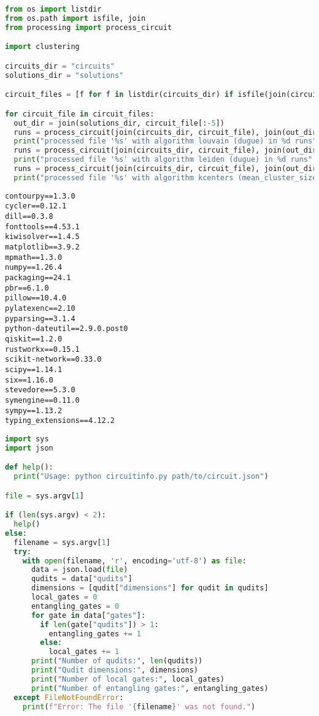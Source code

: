   \begin{lstlisting}[language=Python,caption=\texttt{main.py},label=lst:main.py]
from os import listdir
from os.path import isfile, join
from processing import process_circuit

import clustering

circuits_dir = "circuits"
solutions_dir = "solutions"

circuit_files = [f for f in listdir(circuits_dir) if isfile(join(circuits_dir, f))]

for circuit_file in circuit_files:
  out_dir = join(solutions_dir, circuit_file[:-5])
  runs = process_circuit(join(circuits_dir, circuit_file), join(out_dir, "louvain"), clustering.louvain(modularity="dugue"), max_runs=2)
  print("processed file '%s' with algorithm louvain (dugue) in %d runs" % (circuit_file, runs))
  runs = process_circuit(join(circuits_dir, circuit_file), join(out_dir, "leiden"), clustering.leiden(modularity="dugue"), max_runs=2)
  print("processed file '%s' with algorithm leiden (dugue) in %d runs" % (circuit_file, runs))
  runs = process_circuit(join(circuits_dir, circuit_file), join(out_dir, "kcenters"), clustering.kcenters(mean_cluster_size=4))
  print("processed file '%s' with algorithm kcenters (mean_cluster_size 4) in %d runs" % (circuit_file, runs))
  \end{lstlisting}
  \begin{lstlisting}[caption=\texttt{requirements.txt},label=lst:requirements.txt]
contourpy==1.3.0
cycler==0.12.1
dill==0.3.8
fonttools==4.53.1
kiwisolver==1.4.5
matplotlib==3.9.2
mpmath==1.3.0
numpy==1.26.4
packaging==24.1
pbr==6.1.0
pillow==10.4.0
pylatexenc==2.10
pyparsing==3.1.4
python-dateutil==2.9.0.post0
qiskit==1.2.0
rustworkx==0.15.1
scikit-network==0.33.0
scipy==1.14.1
six==1.16.0
stevedore==5.3.0
symengine==0.11.0
sympy==1.13.2
typing_extensions==4.12.2    
  \end{lstlisting}
  \begin{lstlisting}[language=Python,caption=\texttt{circuitinfo.py},label=lst:circuitinfo.py]
import sys
import json

def help():
  print("Usage: python circuitinfo.py path/to/circuit.json")

file = sys.argv[1]

if (len(sys.argv) < 2):
  help()
else:
  filename = sys.argv[1]
  try:
    with open(filename, 'r', encoding='utf-8') as file:
      data = json.load(file)
      qudits = data["qudits"]
      dimensions = [qudit["dimensions"] for qudit in qudits]
      local_gates = 0
      entangling_gates = 0
      for gate in data["gates"]:
        if len(gate["qudits"]) > 1:
          entangling_gates += 1
        else:
          local_gates += 1
      print("Number of qudits:", len(qudits))
      print("Qudit dimensions:", dimensions)
      print("Number of local gates:", local_gates)
      print("Number of entangling gates:", entangling_gates)
  except FileNotFoundError:
    print(f"Error: The file '{filename}' was not found.")
  \end{lstlisting}
